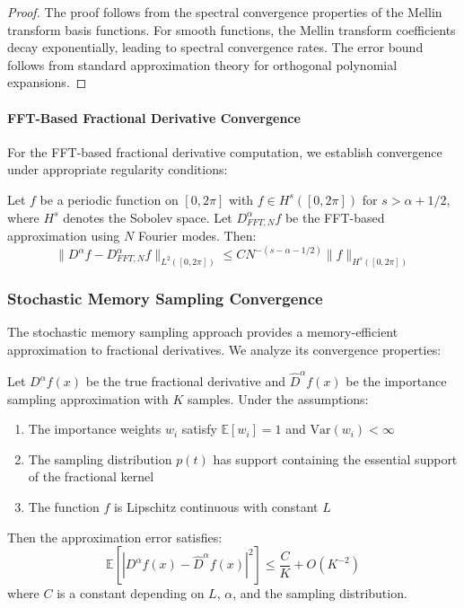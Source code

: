 \begin{proof}
The proof follows from the spectral convergence properties of the Mellin transform basis functions. For smooth functions, the Mellin transform coefficients decay exponentially, leading to spectral convergence rates. The error bound follows from standard approximation theory for orthogonal polynomial expansions.
\end{proof}

\paragraph{FFT-Based Fractional Derivative Convergence}

For the FFT-based fractional derivative computation, we establish convergence under appropriate regularity conditions:

\begin{theorem}
Let $f$ be a periodic function on $[0,2\pi]$ with $f \in H^s([0,2\pi])$ for $s > \alpha + 1/2$, where $H^s$ denotes the Sobolev space. Let $D^{\alpha}_{FFT,N} f$ be the FFT-based approximation using $N$ Fourier modes. Then:
\begin{equation}
\|D^{\alpha} f - D^{\alpha}_{FFT,N} f\|_{L^2([0,2\pi])} \leq C N^{-(s-\alpha-1/2)} \|f\|_{H^s([0,2\pi])}
\end{equation}
\end{theorem}

\subsubsection{Stochastic Memory Sampling Convergence}

The stochastic memory sampling approach provides a memory-efficient approximation to fractional derivatives. We analyze its convergence properties:

\begin{theorem}
Let $D^{\alpha}f(x)$ be the true fractional derivative and $\hat{D}^{\alpha}f(x)$ be the importance sampling approximation with $K$ samples. Under the assumptions:
\begin{enumerate}
\item The importance weights $w_i$ satisfy $\mathbb{E}[w_i] = 1$ and $\text{Var}(w_i) < \infty$
\item The sampling distribution $p(t)$ has support containing the essential support of the fractional kernel
\item The function $f$ is Lipschitz continuous with constant $L$
\end{enumerate}
Then the approximation error satisfies:
\begin{equation}
\mathbb{E}[|D^{\alpha}f(x) - \hat{D}^{\alpha}f(x)|^2] \leq \frac{C}{K} + O(K^{-2})
\end{equation}
where $C$ is a constant depending on $L$, $\alpha$, and the sampling distribution.
\end{theorem}

